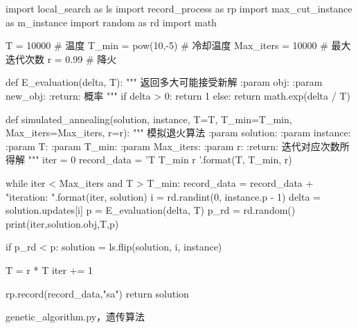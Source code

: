 \documentclass{article}
\begin{document}
    \begin{python}
import local_search as ls
import record_process as rp
import max_cut_instance as m_instance
import random as rd
import math

T = 10000  # 温度
T_min = pow(10,-5)  # 冷却温度
Max_iters = 10000  # 最大迭代次数
r = 0.99  # 降火


def E_evaluation(delta, T):
    """
    返回多大可能接受新解
    :param obj:
    :param new_obj:
    :return: 概率
    """
    if delta > 0:
        return 1
    else:
        return math.exp(delta / T)

def simulated_annealing(solution, instance, T=T, T_min=T_min, Max_iters=Max_iters, r=r):
    """
    模拟退火算法
    :param solution:
    :param instance:
    :param T:
    :param T_min:
    :param Max_iters:
    :param r:
    :return: 迭代对应次数所得解
    """
    iter = 0
    record_data = 'T {} T_min {} r {}\n\n'.format(T, T_min, r)

    while iter < Max_iters and T > T_min:
        record_data = record_data + "iteration: {}\n{}\n\n".format(iter, solution)
        i = rd.randint(0, instance.p - 1)
        delta = solution.updates[i]
        p = E_evaluation(delta, T)
        p_rd = rd.random()
        print(iter,solution.obj,T,p)

        if p_rd < p:
            solution = ls.flip(solution, i, instance)

        T = r * T
        iter += 1

    rp.record(record_data,"sa")
    return solution
    \end{python}
    genetic\_algorithm.py，遗传算法
\end{document}
